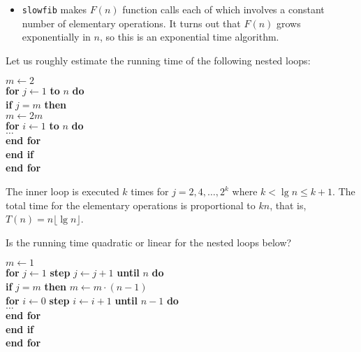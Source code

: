 \begin{frame}
\begin{itemize}[<+->]
\item \texttt{slowfib} makes $F(n)$ function calls each of which involves a
constant number of elementary operations. It turns out that $F(n)$ grows
exponentially in $n$, so this is an \alert{exponential time algorithm}.
\end{itemize}
\end{frame}


\begin{Boxample}[6]
\label{exm:nest2}
Let us roughly estimate the running time of the following nested loops:
 
\hspace*{.3in}\begin{minipage}{5in}
\Algorbody
{
\(m \leftarrow 2\) \\
\textbf{for} \(j \leftarrow 1\) \textbf{to} \(n\) \textbf{do}\\
\>\textbf{if} \(j = m \) \textbf{then} \\
\>\> \(m \leftarrow 2m\) \\
\>\>\textbf{for} \(i \leftarrow  1\) \textbf{to} \(n\) \textbf{do}\\
\>\>\>$\ldots$  \\
\>\>\textbf{end for} \\
\>\textbf{end if}\\
\textbf{end for}\\
}
\end{minipage}

The inner loop is executed $k$ times for $j=2, 4, \ldots, 2^{k}$
where $k < \lg n \le k+1$. The total time for the elementary operations is 
proportional to $kn$, that is, $T(n)=  n  \lfloor \lg n \rfloor$.    
\end{Boxample}

\begin{Boxample}[6]
\label{exm:nest1}
Is the running time quadratic or linear for the nested loops below?\\

\begin{minipage}{5in}
\Algorbody
{
\(m \leftarrow 1\) \\
\textbf{for} \(j \leftarrow 1\) \textbf{step} \(j \leftarrow j+1\) 
                                    \textbf{until} \(n\) \textbf{do}\\
\>\textbf{if} \(j = m \) \textbf{then} \(m \leftarrow m \cdot (n-1)\) \\
\>\>\textbf{for} \(i \leftarrow  0\) \textbf{step} \(i \leftarrow i+1\) 
                                       \textbf{until} \(n-1\) \textbf{do}\\
\>\>\>$\ldots$  \\
\>\>\textbf{end for} \\
\>\textbf{end if}\\
\textbf{end for} \\
}
\end{minipage}

\end{Boxample}


